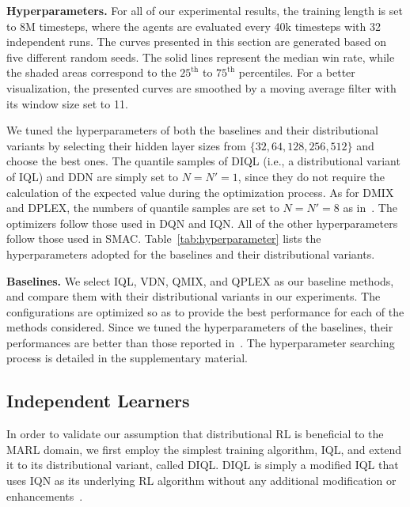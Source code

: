 \documentclass[twoside,11pt]{article}
\newcommand{\numberofquantiles}{N}
\newcommand{\numberofquantilesamples}{N'}
\newcommand{\diql}{DIQL}
\newcommand{\ddn}{DDN}
\newcommand{\dmix}{DMIX}
\begin{document}
\textbf{Hyperparameters.}
For all of our experimental results, the training length is set to 8M timesteps, where the agents are evaluated every 40k timesteps with 32 independent runs. The curves presented in this section are generated based on five different random seeds. The solid lines represent the median win rate, while the shaded areas correspond to the $25^{\text{th}}$ to $75^{\text{th}}$ percentiles. For a better visualization, the presented curves are smoothed by a moving average filter with its window size set to 11. 

We tuned the hyperparameters of both the baselines and their distributional variants by selecting their hidden layer sizes from $\{32,64,128,256,512\}$ and choose the best ones. The quantile samples of \diql{} (i.e., a distributional variant of IQL) and \ddn{} are simply set to $\numberofquantiles{}=\numberofquantilesamples{}=1$, since they do not require the calculation of the expected value during the optimization process. As for \dmix{} and DPLEX, the numbers of quantile samples are set to $\numberofquantiles{}=\numberofquantilesamples{}=8$ as in~\cite{Dabney2018IQN}. The optimizers follow those used in DQN and IQN. All of the other hyperparameters follow those used in SMAC. Table~\ref{tab:hyperparameter} lists the hyperparameters adopted for the baselines and their distributional variants.

\textbf{Baselines.}
We select IQL, VDN, QMIX, and QPLEX as our baseline methods, and compare them with their distributional variants in our experiments. The configurations are optimized so as to provide the best performance for each of the methods considered.
Since we tuned the hyperparameters of the baselines, their performances are better than those reported in~\citep{Samvelyan2019SMAC}. The hyperparameter searching process is detailed in the supplementary material.



\subsection{Independent Learners}
\label{subsec:experiment_results_independent_learners}

In order to validate our assumption that distributional RL is beneficial to the MARL domain, we first employ the simplest training algorithm, IQL, and extend it to its distributional variant, called \diql{}. \diql{} is simply a modified IQL that uses IQN as its underlying RL algorithm without any additional modification or enhancements~\citep{Matignon2007Hysteretic,Lyu2020LikelihoodQuantile}.
\end{document}
